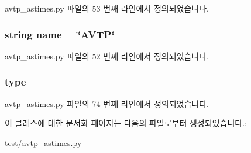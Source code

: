 avtp\+\_\+astimes.\+py 파일의 53 번째 라인에서 정의되었습니다.

\subsubsection[{\texorpdfstring{name}{name}}]{\setlength{\rightskip}{0pt plus 5cm}string name = \char`\"{}A\+V\+TP\char`\"{}\hspace{0.3cm}{\ttfamily [static]}}\hypertarget{classavtp__astimes_1_1_a_v_t_p_a8ccf841cb59e451791bcb2e1ac4f1edc}{}\label{classavtp__astimes_1_1_a_v_t_p_a8ccf841cb59e451791bcb2e1ac4f1edc}


avtp\+\_\+astimes.\+py 파일의 52 번째 라인에서 정의되었습니다.

\subsubsection[{\texorpdfstring{type}{type}}]{\setlength{\rightskip}{0pt plus 5cm}type\hspace{0.3cm}{\ttfamily [static]}}\hypertarget{classavtp__astimes_1_1_a_v_t_p_a7aead736a07eaf25623ad7bfa1f0ee2d}{}\label{classavtp__astimes_1_1_a_v_t_p_a7aead736a07eaf25623ad7bfa1f0ee2d}


avtp\+\_\+astimes.\+py 파일의 74 번째 라인에서 정의되었습니다.



이 클래스에 대한 문서화 페이지는 다음의 파일로부터 생성되었습니다.\+:\begin{DoxyCompactItemize}
\item 
test/\hyperlink{avtp__astimes_8py}{avtp\+\_\+astimes.\+py}\end{DoxyCompactItemize}
